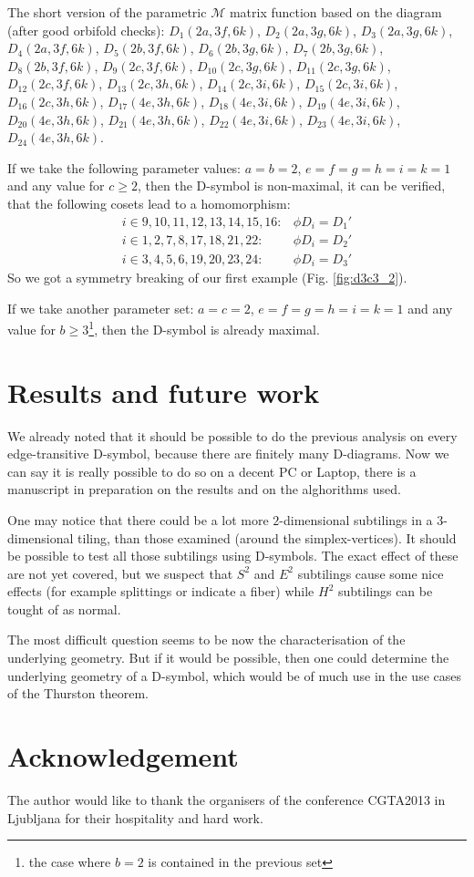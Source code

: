 \documentclass[12pt,a4paper]{article}
\numberwithin{equation}{section}
\theoremstyle{plain}%
\theoremstyle{definition}
\theoremstyle{remark}
\begin{document}
The short version of the parametric $\mathcal{M}$ matrix function based on the
diagram (after good orbifold checks): $D_1(2a, 3f, 6k)$, $D_2(2a, 3g, 6k)$,
$D_3(2a, 3g, 6k)$, $D_4(2a, 3f, 6k)$, $D_5(2b, 3f, 6k)$, $D_6(2b, 3g, 6k)$,
$D_7(2b, 3g, 6k)$, $D_8(2b, 3f, 6k)$, $D_9(2c, 3f, 6k)$, $D_{10}(2c, 3g, 6k)$,
$D_{11}(2c, 3g, 6k)$, $D_{12}(2c, 3f, 6k)$, $D_{13}(2c, 3h, 6k)$, $D_{14}(2c,
3i, 6k)$, $D_{15}(2c, 3i, 6k)$, $D_{16}(2c, 3h, 6k)$, $D_{17}(4e, 3h, 6k)$,
$D_{18}(4e, 3i, 6k)$, $D_{19}(4e, 3i, 6k)$, $D_{20}(4e, 3h, 6k)$, $D_{21}(4e,
3h, 6k)$, $D_{22}(4e, 3i, 6k)$, $D_{23}(4e, 3i, 6k)$, $D_{24}(4e, 3h, 6k)$.

If we take the following parameter values: $a=b=2$, $e=f=g=h=i=k=1$ and any value
for $c\geq2$, then the D-symbol is non-maximal, it can be verified, that the
following cosets lead to a homomorphism:
\begin{align}
  i\in{9,10,11,12,13,14,15,16}: & \phi{D_i}=D_1' \\
  i\in{1,2,7,8,17,18,21,22}: & \phi{D_i}=D_2' \\
  i\in{3,4,5,6,19,20,23,24}: & \phi{D_i}=D_3'
\end{align}
So we got a symmetry breaking of our first example (Fig. \ref{fig:d3c3_2}).

If we take another parameter set: $a=c=2$, $e=f=g=h=i=k=1$ and any value
for $b\geq3$\footnote{the case where $b=2$ is contained in the previous set},
then the D-symbol is already maximal.

\section{Results and future work}
We already noted that it should be possible to do the previous analysis on every
edge-transitive D-symbol, because there are finitely many D-diagrams. Now we can
say it is really possible to do so on a decent PC or Laptop, there is a
manuscript in preparation on the results and on the alghorithms used.

One may notice that there could be a lot more $2$-dimensional subtilings in a
$3$-dimensional tiling, than those examined (around the simplex-vertices). It
should be possible to test all those subtilings using D-symbols. The exact
effect of these are not yet covered, but we suspect that $S^2$ and $E^2$
subtilings cause some nice effects (for example splittings or indicate a fiber)
while $H^2$ subtilings can be tought of as normal.

The most difficult question seems to be now the characterisation of
the underlying geometry. But if it would be possible, then one could determine
the underlying geometry of a D-symbol, which would be of much use in the use
cases of the Thurston theorem.

\section{Acknowledgement}
The author would like to thank the organisers of the conference CGTA2013 in
Ljubljana for their hospitality and hard work.

\nocite{DHM93,D87,Du88,H93,LM90,Ma67,M94,T82,VS93,F94,M11,DDH98,K11,LMS94}


\end{document}
